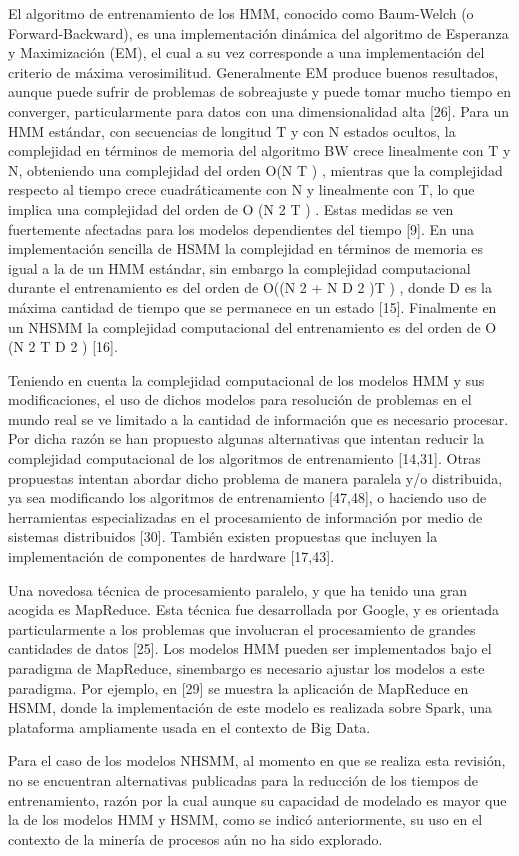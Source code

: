 El algoritmo de entrenamiento de los HMM, conocido como Baum-Welch (o Forward-Backward), es una implementación dinámica del algoritmo de Esperanza y Maximización (EM), el cual a su vez corresponde a una implementación del criterio de máxima verosimilitud. Generalmente EM produce buenos resultados, aunque puede sufrir de problemas de sobreajuste y puede tomar mucho tiempo en converger, particularmente para datos con una dimensionalidad alta [26]. Para un HMM estándar, con secuencias de longitud T y con N estados ocultos, la complejidad en términos de memoria del algoritmo BW crece linealmente con T y N, obteniendo una complejidad del orden O(N T ) , mientras que la complejidad respecto al tiempo crece cuadráticamente con N y linealmente con T, lo que implica una complejidad del orden de O (N 2 T ) . Estas medidas se ven fuertemente afectadas para los modelos dependientes del tiempo [9]. En una implementación sencilla de HSMM la complejidad en términos de memoria es igual a la de un HMM estándar, sin embargo la complejidad computacional durante el entrenamiento es del orden de O((N 2 + N D 2 )T ) , donde D es la máxima cantidad de tiempo que se permanece en un estado [15]. Finalmente en un NHSMM la complejidad computacional del entrenamiento es del orden de O (N 2 T D 2 ) [16].

Teniendo en cuenta la complejidad computacional de los modelos HMM y sus modificaciones, el uso de dichos modelos para resolución de problemas en el mundo real se ve limitado a la cantidad de información que es necesario procesar. Por dicha razón se han propuesto algunas alternativas que intentan reducir la complejidad computacional de los algoritmos de entrenamiento [14,31]. Otras propuestas intentan abordar dicho problema de manera paralela y/o distribuida, ya sea modificando los algoritmos de entrenamiento [47,48], o haciendo uso de herramientas especializadas en el procesamiento de información por medio de sistemas distribuidos [30]. También existen propuestas que incluyen la implementación de componentes de hardware [17,43].

Una novedosa técnica de procesamiento paralelo, y que ha tenido una gran acogida es MapReduce. Esta técnica fue desarrollada por Google, y es orientada particularmente a los problemas que involucran el procesamiento de grandes cantidades de datos [25]. Los modelos HMM pueden ser implementados bajo el paradigma de MapReduce, sinembargo es necesario ajustar los modelos a este paradigma. Por ejemplo, en [29] se muestra la aplicación de MapReduce en HSMM, donde la implementación de este modelo es realizada sobre Spark, una plataforma ampliamente usada en el contexto de Big Data.

Para el caso de los modelos NHSMM, al momento en que se realiza esta revisión, no se encuentran alternativas publicadas para la reducción de los tiempos de entrenamiento, razón por la cual aunque su capacidad de modelado es mayor que la de los modelos HMM y HSMM, como se indicó anteriormente, su uso en el contexto de la minería de procesos aún no ha sido explorado.
